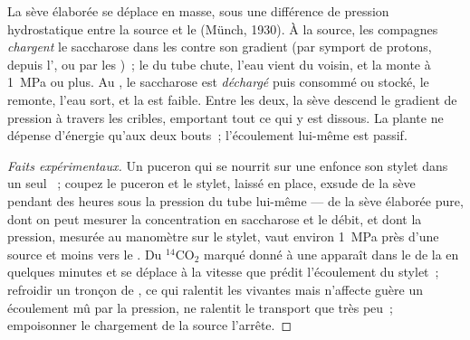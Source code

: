 \begin{theorem}\label{thm:b1:plant-transport:pressureflow}
La sève élaborée se déplace en masse, sous une différence de pression
hydrostatique entre la source et le  (Münch, 1930). À la source,
les  compagnes \emph{chargent} le saccharose dans les  contre son gradient (par symport de protons, depuis
l', ou par les )~; le  du tube
chute, l'eau vient du  voisin, et la  monte à
\qty{1}{MPa} ou plus. Au , le saccharose est \emph{déchargé} puis
consommé ou stocké, le  remonte, l'eau sort, et la
 est faible. Entre les deux, la sève descend le gradient de
pression à travers les cribles, emportant tout ce qui y est dissous. La
plante ne dépense d'énergie qu'aux deux bouts~; l'écoulement lui-même
est passif.
\end{theorem}
\begin{proof}[Faits expérimentaux]
Un puceron qui se nourrit sur une  enfonce son stylet dans un seul
~; coupez le puceron et le stylet, laissé en place, exsude
de la sève pendant des heures sous la pression du tube lui-même --- de
la sève élaborée pure, dont on peut mesurer la concentration en
saccharose et le débit, et dont la pression, mesurée au manomètre sur
le stylet, vaut environ \qty{1}{MPa} près d'une source et moins vers le
. Du $\mathrm{^{14}CO_2}$ marqué donné à une  apparaît dans
le  de la  en quelques minutes et se déplace à la vitesse
que prédit l'écoulement du stylet~; refroidir un tronçon de , ce
qui ralentit les  vivantes mais n'affecte guère un écoulement
mû par la pression, ne ralentit le transport que très peu~; empoisonner
le chargement de la  source l'arrête.
\end{proof}

